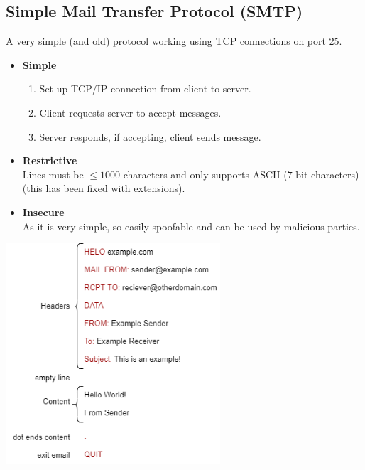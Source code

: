 \subsection{Simple Mail Transfer Protocol (SMTP)}
A very simple (and old) protocol working using TCP connections on port 25.
\begin{itemize}
    \setlength\itemsep{0em}
    \item {\textbf{Simple}
          \begin{enumerate}
              \setlength\itemsep{0em}
              \item Set up TCP/IP connection from client to server.
              \item Client requests server to accept messages.
              \item Server responds, if accepting, client sends message.
          \end{enumerate}
          }
          \item{\textbf{Restrictive}
                      \\ Lines must be $\leq 1000$ characters and only supports ASCII ($7$ bit characters) (this has been fixed with extensions).
                }
          \item{ \textbf{Insecure}
                      \\ As it is very simple, so easily spoofable and can be used by malicious parties.
                }
\end{itemize}
\begin{center}\includegraphics[width=0.6\textwidth]{the_web/images/SMTP format.png}\end{center}
